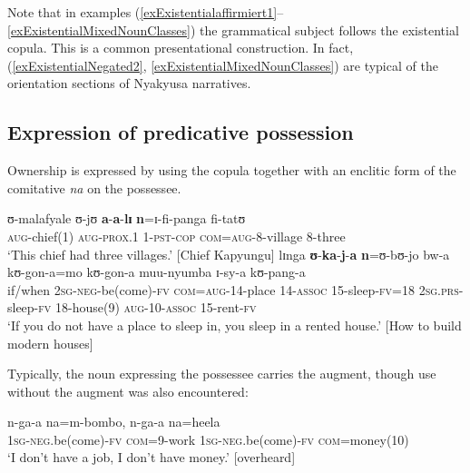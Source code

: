 Note that in examples (\ref{exExistentialaffirmiert1}--\ref{exExistentialMixedNounClasses}) the grammatical subject follows the existential copula. This is a common presentational construction. In fact, (\ref{exExistentialNegated2}, \ref{exExistentialMixedNounClasses}) are typical of the orientation sections of Nyakyusa narratives.

\subsection{Expression of predicative possession}\label{PredicativePosession}
Ownership is expressed by using the copula together with an enclitic form of the comitative \textit{na} on the possessee.

\begin{exe}
\ex \gll ʊ-malafyale ʊ-jʊ \textbf{a}-\textbf{a}-\textbf{lɪ} \textbf{n}=ɪ-fi-panga fi-tatʊ\\
\textsc{aug}-chief(1) \textsc{aug}-\textsc{prox.1} 1-\textsc{pst}-\textsc{cop} \textsc{com}=\textsc{aug}-8-village 8-three\\
\glt `This chief had three villages.' [Chief Kapyungu]
\ex \label{exPredicativePosession2}\gll lɪnga \textbf{ʊ}-\textbf{ka}-\textbf{j}-\textbf{a} \textbf{n}=ʊ-bʊ-jo bw-a kʊ-gon-a=mo kʊ-gon-a muu-nyumba ɪ-sy-a kʊ-pang-a\\
if/when \textsc{2sg}-\textsc{neg}-be(come)-\textsc{fv} \textsc{com}=\textsc{aug}-14-place 14-\textsc{assoc} 15-sleep-\textsc{fv}=18 \textsc{2sg.prs}-sleep-\textsc{fv} 18-house(9) \textsc{aug}-10-\textsc{assoc} 15-rent-\textsc{fv}\\
\glt `If you do not have a place to sleep in, you sleep in a rented house.' [How to build modern houses]
\end{exe}

Typically, the noun expressing the possessee carries the augment, though use without the augment was also encountered:
\begin{exe}
\ex \gll n-ga-a na=m-bombo, n-ga-a na=heela\\
\textsc{1sg}-\textsc{neg}.be(come)-\textsc{fv} \textsc{com}=9-work \textsc{1sg}-\textsc{neg}.be(come)-\textsc{fv} \textsc{com}=money(10)\\
\glt `I don't have a job, I don't have money.' [overheard]
\end{exe}

